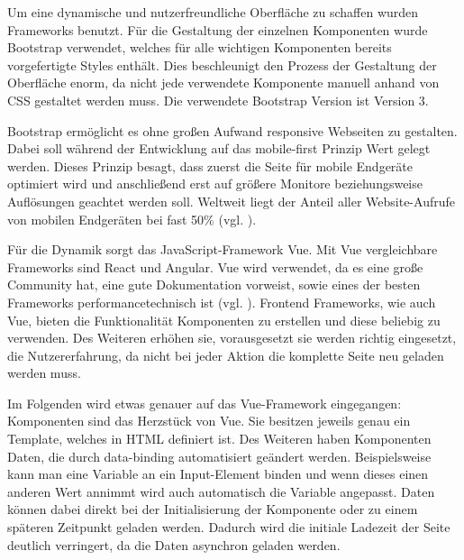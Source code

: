 Um eine dynamische und nutzerfreundliche Oberfläche zu schaffen wurden Frameworks benutzt. 
Für die Gestaltung der einzelnen Komponenten wurde Bootstrap verwendet, welches für alle wichtigen Komponenten bereits vorgefertigte Styles enthält.
Dies beschleunigt den Prozess der Gestaltung der Oberfläche enorm, da nicht jede verwendete Komponente manuell anhand von \ac{CSS} gestaltet werden muss. 
Die verwendete Bootstrap Version ist Version 3.

Bootstrap ermöglicht es ohne großen Aufwand responsive Webseiten zu gestalten. 
Dabei soll während der Entwicklung auf das mobile-first Prinzip Wert gelegt werden. 
Dieses Prinzip besagt, dass zuerst die Seite für mobile Endgeräte optimiert wird und anschließend erst auf größere Monitore beziehungsweise Auflösungen geachtet werden soll. 
Weltweit liegt der Anteil aller Website-Aufrufe von mobilen Endgeräten bei fast 50\% (vgl. \cite{.stat-mobile}). 

Für die Dynamik sorgt das JavaScript-Framework Vue. Mit Vue vergleichbare Frameworks sind React und Angular. Vue wird verwendet, da es eine große Community hat, eine gute Dokumentation vorweist, sowie eines der besten Frameworks performancetechnisch ist (vgl. \cite{.vue-react-angular}).
Frontend Frameworks, wie auch Vue, bieten die Funktionalität Komponenten zu erstellen und diese beliebig zu verwenden. 
Des Weiteren erhöhen sie, vorausgesetzt sie werden richtig eingesetzt, die Nutzererfahrung, da nicht bei jeder Aktion die komplette Seite neu geladen werden muss.

Im Folgenden wird etwas genauer auf das Vue-Framework eingegangen:
Komponenten sind das Herzstück von Vue. Sie besitzen jeweils genau ein Template, welches in \ac{HTML} definiert ist. 
Des Weiteren haben Komponenten Daten, die durch data-binding automatisiert geändert werden. 
Beispielsweise kann man eine Variable an ein Input-Element binden und wenn dieses einen anderen Wert annimmt wird auch automatisch die Variable angepasst. 
Daten können dabei direkt bei der Initialisierung der Komponente oder zu einem späteren Zeitpunkt geladen werden.
Dadurch wird die initiale Ladezeit der Seite deutlich verringert, da die Daten asynchron geladen werden.
